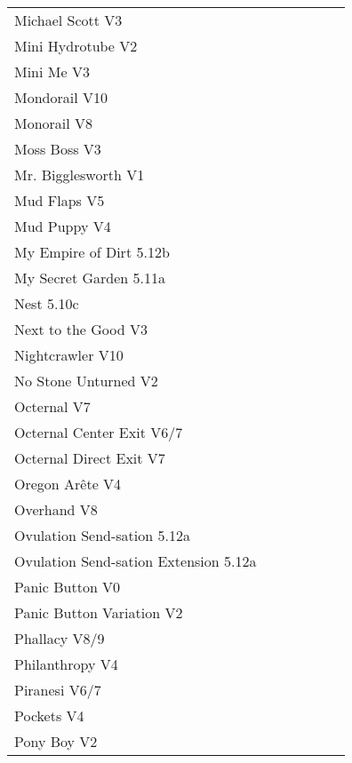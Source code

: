 \begin{flushleft}
\begin{center}
\begin{supertabular}{p{0.76\linewidth}p{0.08\linewidth}}
Michael Scott V3 & \pageref{rt:Michael Scott} \\
Mini Hydrotube V2 & \pageref{rt:Mini Hydrotube} \\
Mini Me V3 & \pageref{rt:Mini Me} \\
Mondorail V10 & \pageref{vr:Monorail Extension Project} \\
Monorail V8 & \pageref{rt:Monorail} \\
Moss Boss V3 & \pageref{rt:Moss Boss} \\
Mr. Bigglesworth V1 & \pageref{vr:Mr. Bigglesworth} \\
Mud Flaps V5 & \pageref{rt:Mud Flaps} \\
Mud Puppy V4 & \pageref{vr:Mud Puppy} \\
My Empire of Dirt 5.12b & \pageref{rt:My Empire of Dirt} \\
My Secret Garden 5.11a & \pageref{rt:My Secret Garden} \\
Nest 5.10c & \pageref{rt:Nest} \\
Next to the Good V3 & \pageref{rt:Next to the Good} \\
Nightcrawler V10 & \pageref{rt:Nightcrawler} \\
No Stone Unturned V2 & \pageref{rt:No Stone Unturned} \\
Octernal V7 & \pageref{rt:Octernal} \\
Octernal Center Exit V6/7 & \pageref{vr:Octernal Center Exit} \\
Octernal Direct Exit V7 & \pageref{vr:Octernal Direct Exit} \\
Oregon Arête V4 & \pageref{rt:Oregon Arête} \\
Overhand V8 & \pageref{rt:Overhand} \\
Ovulation Send-sation 5.12a & \pageref{rt:Ovulation Send-sation} \\
Ovulation Send-sation Extension 5.12a & \pageref{vr:Ovulation Send-sation Extension} \\
Panic Button V0 & \pageref{rt:Panic Button} \\
Panic Button Variation V2 & \pageref{vr:Panic Button Variation} \\
Phallacy V8/9 & \pageref{rt:Phallacy} \\
Philanthropy V4 & \pageref{rt:Philanthropy} \\
Piranesi V6/7 & \pageref{rt:Piranesi} \\
Pockets V4 & \pageref{rt:Pockets} \\
Pony Boy V2 & \pageref{rt:Pony Boy} \\

\end{supertabular}
\end{center}
\end{flushleft}
